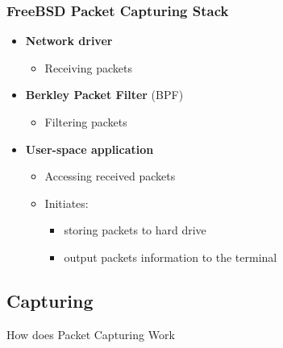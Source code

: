 \documentclass{beamer}
\begin{document}
\begin{frame}
\frametitle{FreeBSD Packet Capturing Stack}
\begin{itemize}
	\item \textbf{Network driver}
		\begin{itemize}
			\item Receiving packets\newline
		\end{itemize}
	\item \textbf{Berkley Packet Filter} (BPF)
		\begin{itemize}
			\item Filtering packets\newline
		\end{itemize}
	\item \textbf{User-space application}
		\begin{itemize}
			\item Accessing received packets
			\item Initiates:
				\begin{itemize}
					\item storing packets to hard drive
					\item output packets information to the terminal
				\end{itemize}
		\end{itemize}
\end{itemize}
\end{frame}

\subsection*{Capturing}
\begin{frame}
	\begin{center}
	\huge{How does Packet Capturing Work}
	\end{center}
\end{frame}
\end{document}
